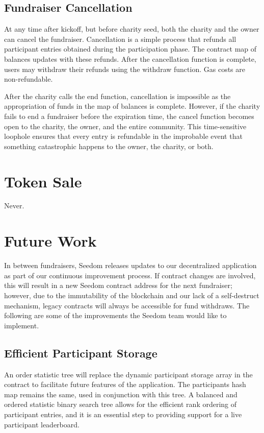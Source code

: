 \documentclass[11pt]{article}
\begin{document}
\subsection{Fundraiser Cancellation}

At any time after kickoff, but before charity seed, both the charity and the owner can cancel the fundraiser. Cancellation is a simple process that refunds all participant entries obtained during the participation phase. The contract map of balances updates with these refunds. After the cancellation function is complete, users may withdraw their refunds using the withdraw function. Gas costs are non-refundable.

After the charity calls the end function, cancellation is impossible as the appropriation of funds in the map of balances is complete. However, if the charity fails to end a fundraiser before the expiration time, the cancel function becomes open to the charity, the owner, and the entire community. This time-sensitive loophole ensures that every entry is refundable in the improbable event that something catastrophic happens to the owner, the charity, or both.

\section{Token Sale}
Never.

\section{Future Work}

In between fundraisers, Seedom releases updates to our decentralized application as part of our continuous improvement process. If contract changes are involved, this will result in a new Seedom contract address for the next fundraiser; however, due to the immutability of the blockchain and our lack of a self-destruct mechanism, legacy contracts will always be accessible for fund withdraws. The following are some of the improvements the Seedom team would like to implement.

\subsection{Efficient Participant Storage}

An order statistic tree \cite{5} will replace the dynamic participant storage array in the contract to facilitate future features of the application. The participants hash map remains the same, used in conjunction with this tree. A balanced and ordered statistic binary search tree allows for the efficient rank ordering of participant entries, and it is an essential step to providing support for a live participant leaderboard.
\end{document}
